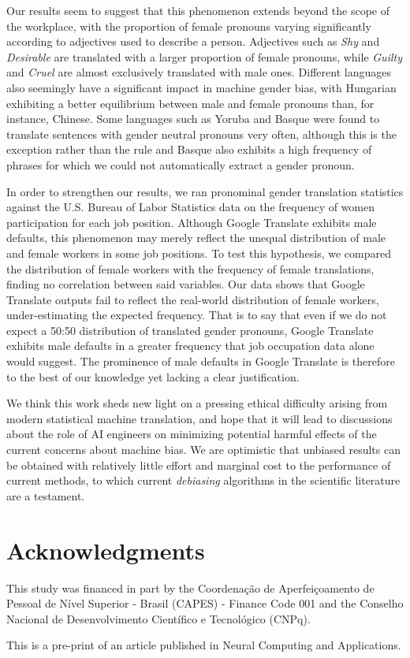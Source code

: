 \documentclass[twoside,11pt]{article}
\begin{document}
Our results seem to suggest that this phenomenon extends beyond the scope of the workplace, with the proportion of female pronouns varying significantly according to adjectives used to describe a person. Adjectives such as \emph{Shy} and \emph{Desirable} are translated with a larger proportion of female pronouns, while \emph{Guilty} and \emph{Cruel} are almost exclusively translated with male ones. Different languages also seemingly have a significant impact in machine gender bias, with Hungarian exhibiting a better equilibrium between male and female pronouns than, for instance, Chinese. Some languages such as Yoruba and Basque were found to translate sentences with gender neutral pronouns very often, although this is the exception rather than the rule and Basque also exhibits a high frequency of phrases for which we could not automatically extract a gender pronoun.

In order to strengthen our results, we ran pronominal gender translation statistics against the U.S. Bureau of Labor Statistics data on the frequency of women participation for each job position. Although Google Translate exhibits male defaults, this phenomenon may merely reflect the unequal distribution of male and female workers in some job positions. To test this hypothesis, we compared the distribution of female workers with the frequency of female translations, finding no correlation between said variables. Our data shows that Google Translate outputs fail to reflect the real-world distribution of female workers, under-estimating the expected frequency. That is to say that even if we do not expect a 50:50 distribution of translated gender pronouns, Google Translate exhibits male defaults in a greater frequency that job occupation data alone would suggest. The prominence of male defaults in Google Translate is therefore to the best of our knowledge yet lacking a clear justification.

We think this work sheds new light on a  pressing ethical difficulty arising from modern statistical machine translation, and hope that it will lead to discussions about the role of AI engineers on minimizing potential harmful effects of the current concerns about machine bias. We are optimistic that unbiased results can be obtained with relatively little effort and marginal cost to the performance of current methods, to which current \emph{debiasing} algorithms in the scientific literature are a testament.

\section{Acknowledgments}

This study was financed in part by the Coordenação de Aperfeiçoamento de Pessoal de Nível Superior - Brasil (CAPES) - Finance Code 001 and the Conselho Nacional de Desenvolvimento Científico e Tecnológico (CNPq).

This is a pre-print of an article published in Neural Computing and Applications.

\vskip 0.2in



\end{document}

